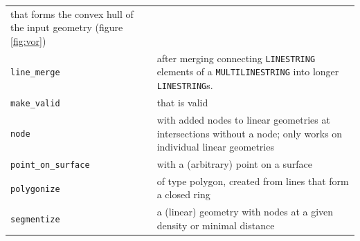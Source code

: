\documentclass[]{book}
\begin{document}
\begin{longtable}[]{@{}ll@{}}
\begin{minipage}[t]{0.71\columnwidth}
that forms the convex hull of the input geometry (figure \ref{fig:vor})\strut
\end{minipage}\tabularnewline
\begin{minipage}[t]{0.23\columnwidth}\raggedright
\texttt{line\_merge}\strut
\end{minipage} & \begin{minipage}[t]{0.71\columnwidth}\raggedright
after merging connecting \texttt{LINESTRING} elements of a \texttt{MULTILINESTRING} into longer \texttt{LINESTRING}s.\strut
\end{minipage}\tabularnewline
\begin{minipage}[t]{0.23\columnwidth}\raggedright
\texttt{make\_valid}\strut
\end{minipage} & \begin{minipage}[t]{0.71\columnwidth}\raggedright
that is valid\strut
\end{minipage}\tabularnewline
\begin{minipage}[t]{0.23\columnwidth}\raggedright
\texttt{node}\strut
\end{minipage} & \begin{minipage}[t]{0.71\columnwidth}\raggedright
with added nodes to linear geometries at intersections without a node; only works on individual linear geometries\strut
\end{minipage}\tabularnewline
\begin{minipage}[t]{0.23\columnwidth}\raggedright
\texttt{point\_on\_surface}\strut
\end{minipage} & \begin{minipage}[t]{0.71\columnwidth}\raggedright
with a (arbitrary) point on a surface\strut
\end{minipage}\tabularnewline
\begin{minipage}[t]{0.23\columnwidth}\raggedright
\texttt{polygonize}\strut
\end{minipage} & \begin{minipage}[t]{0.71\columnwidth}\raggedright
of type polygon, created from lines that form a closed ring\strut
\end{minipage}\tabularnewline
\begin{minipage}[t]{0.23\columnwidth}\raggedright
\texttt{segmentize}\strut
\end{minipage} & \begin{minipage}[t]{0.71\columnwidth}\raggedright
a (linear) geometry with nodes at a given density or minimal distance\strut
\end{minipage}\tabularnewline

\end{longtable}
\end{document}

